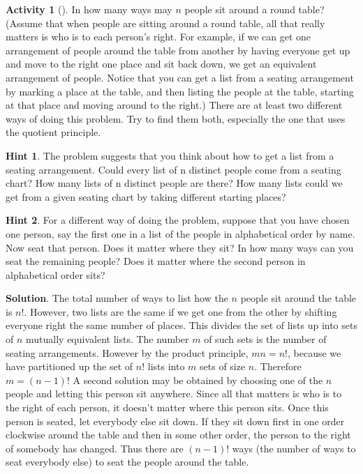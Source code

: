 \documentclass[10pt,]{book}
\theoremstyle{plain}
\theoremstyle{definition}
\theoremstyle{definition}
\theoremstyle{definition}
\newtheorem{activity}[project]{Activity}
\theoremstyle{definition}
\numberwithin{equation}{chapter}
\begin{document}
\begin{activity}[]\label{roundtable}
\hypertarget{p-668}{}%
In how many ways may \(n\) people sit around a round table? (Assume that when people are sitting around a round table, all that really matters is who is to each person's right. For example, if we can get one arrangement of people around the table from another by having everyone get up and move to the right one place and sit back down, we get an equivalent arrangement of people. Notice that you can get a list from a seating arrangement by marking a place at the table, and then listing the people at the table, starting at that place and moving around to the right.) There are at least two different ways of doing this problem. Try to find them both, especially the one that uses the quotient principle.%
\par\smallskip%
\noindent\textbf{Hint 1}.\hypertarget{hint-40}{}\quad%
\hypertarget{p-669}{}%
The problem suggests that you think about how to get a list from a seating arrangement. Could every list of n distinct people come from a seating chart? How many lists of n distinct people are there? How many lists could we get from a given seating chart by taking different starting places?%
\par\smallskip%
\noindent\textbf{Hint 2}.\hypertarget{hint-41}{}\quad%
\hypertarget{p-670}{}%
For a different way of doing the problem, suppose that you have chosen one person, say the first one in a list of the people in alphabetical order by name. Now seat that person. Does it matter where they sit? In how many ways can you seat the remaining people? Does it matter where the second person in alphabetical order sits?%
\par\smallskip%
\noindent\textbf{Solution}.\hypertarget{solution-59}{}\quad%
\hypertarget{p-671}{}%
The total number of ways to list how the \(n\) people sit around the table is \(n!\). However, two lists are the same if we get one from the other by shifting everyone right the same number of places. This divides the set of lists up into sets of \(n\) mutually equivalent lists. The number \(m\) of such sets is the number of seating arrangements. However by the product principle, \(mn=n!\), because we have partitioned up the set of \(n!\) lists into \(m\) sets of size \(n\). Therefore \(m=(n-1)!\) A second solution may be obtained by choosing one of the \(n\) people and letting this person sit anywhere. Since all that matters is who is to the right of each person, it doesn't matter where this person sits. Once this person is seated, let everybody else sit down. If they sit down first in one order clockwise around the table and then in some other order, the person to the right of somebody has changed. Thus there are \((n-1)!\) ways (the number of ways to seat everybody else) to seat the people around the table.%
\end{activity}
\end{document}
